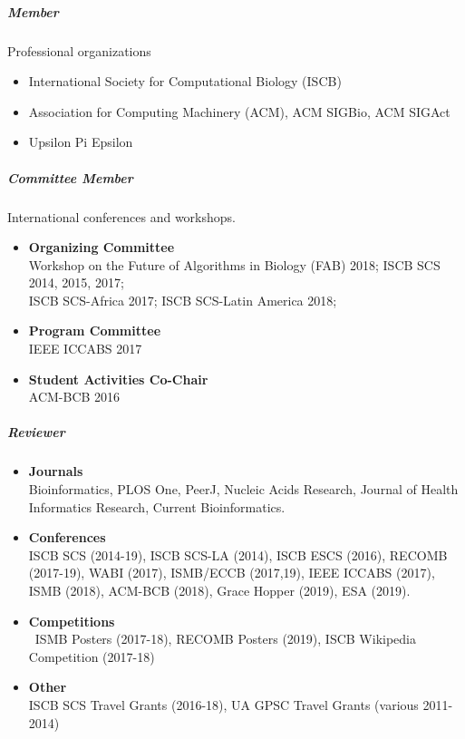 \documentclass[10pt,letterpaper]{article}
\begin{document}
\subparagraph{Member} Professional organizations
\begin{itemize}
\item International Society for Computational Biology (ISCB)
\item Association for Computing Machinery (ACM), ACM SIGBio, ACM SIGAct
\item Upsilon Pi Epsilon
\end{itemize}



\newpage

\subparagraph{Committee Member} International conferences and workshops.
\begin{itemize}[leftmargin=!,labelindent=5pt,itemindent=-15pt]
    \item \textbf{Organizing Committee} \\
    Workshop on the Future of Algorithms in Biology (FAB) 2018; 
    ISCB SCS 2014, 2015, 2017;  \\
    ISCB SCS\nobreakdash-Africa 2017; 
    ISCB SCS-Latin America 2018;  
    \item \textbf{Program Committee} \\ IEEE ICCABS 2017
    \item \textbf{Student Activities Co-Chair} \\ ACM-BCB 2016
\end{itemize}

\subparagraph{Reviewer} 
\begin{itemize}[leftmargin=!,labelindent=5pt,itemindent=-15pt]
    \item \textbf{Journals} \\
        Bioinformatics, 
        PLOS One, 
        PeerJ, 
        Nucleic Acids Research, 
        Journal of Health Informatics Research,
        Current Bioinformatics.
    \item \textbf{Conferences} \\
        ISCB SCS (2014-19), %
        ISCB SCS-LA (2014), %
        ISCB ESCS (2016), %
	RECOMB (2017-19), %
	WABI (2017), %
	ISMB/ECCB (2017,19), %
    	IEEE ICCABS (2017), %
	ISMB (2018), %
	ACM-BCB (2018), %
	Grace Hopper (2019), %
	ESA (2019). %
     \item \textbf{Competitions} \\\
     	ISMB Posters (2017-18),
	RECOMB Posters (2019), 
     	ISCB Wikipedia Competition (2017-18)
     \item \textbf{Other} \\
         ISCB SCS Travel Grants (2016-18), 
         UA GPSC Travel Grants (various 2011-2014)
\end{itemize}
\end{document}
